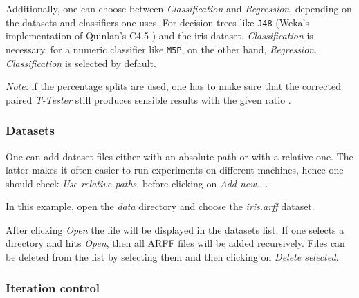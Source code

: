 \documentclass[a4paper]{article}
\begin{document}
Additionally, one can choose between \textit{Classification} and \textit{Regression}, depending on the datasets and classifiers one uses. For decision trees like \texttt{J48} (Weka's implementation of Quinlan's C4.5 \cite{quinlan}) and the iris dataset, \textit{Classification} is necessary, for a numeric classifier like \texttt{M5P}, on the other hand, \textit{Regression}. \textit{Classification} is selected by default.

\textit{Note:} if the percentage splits are used, one has to make sure that the corrected paired \textit{T-Tester} still produces sensible results with the given ratio \cite{bengio}.


\subsubsection{Datasets}

One can add dataset files either with an absolute path or with a relative one. The latter makes it often easier to run experiments on different machines, hence one should check \textit{Use relative paths}, before clicking on \textit{Add new...}.

\begin{center}
\end{center}


In this example, open the \textit{data} directory and choose the \textit{iris.arff} dataset.

\begin{center}
\end{center}


After clicking \textit{Open} the file will be displayed in the datasets list. If one selects a directory and hits \textit{Open}, then all ARFF files will be added recursively. Files can be deleted from the list by selecting them and then clicking on \textit{Delete selected}.

\begin{center}
\end{center}


\subsubsection{Iteration control}
\end{document}
